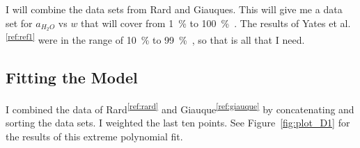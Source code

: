\documentclass[]{tufte-handout}
\newcommand{\tss}[1]{\textsuperscript{#1}}
\begin{document}
I will combine the data sets from Rard and Giauques. This will give me a data set for $a_{H_2O}$ vs $w$ that will cover from \qty{1}{\percent} to \qty{100}{\percent{}}. The results of Yates et al.\tss{\ref{ref:ref1}} were in the range of \qty{10}{\percent} to \qty{99}{\percent{}}, so that is all that I need.

\subsection{Fitting the Model}

I combined the data of Rard\tss{\ref{ref:rard}} and Giauque\tss{\ref{ref:giauque}} by concatenating and sorting the data sets. I weighted the last ten points. See Figure~\vref{fig:plot_D1} for the results of this extreme polynomial fit.
\end{document}
